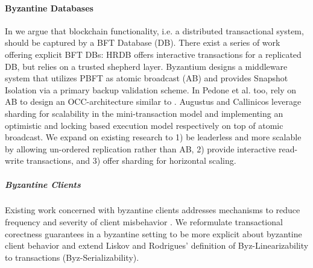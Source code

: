 \paragraph{Byzantine Databases}
In \sys we argue that blockchain functionality, i.e. a distributed transactional system, should be captured by a BFT Database (DB). There exist a series of work offering explicit BFT DBs: HRDB \cite{vandiver2007tolerating} offers interactive transactions for a replicated DB, but relies on a trusted shepherd layer. Byzantium \cite{garcia2011efficient} designs a middleware system that utilizes PBFT as atomic broadcast (AB) and provides Snapshot Isolation via a primary backup validation scheme. In \cite{pedone2012byzantine} Pedone et al. too, rely on AB to design an OCC-architecture similar to \sys. Augustus \cite{padilha2013augustus} and Callinicos \cite{padilha2016callinicos} leverage sharding for scalability in the mini-transaction model \cite{aguilera2007sinfonia} and implementing an optimistic and locking based execution model respectively on top of atomic broadcast.
We expand on existing research to 1) be leaderless and more scalable by allowing un-ordered replication rather than AB, 2) provide interactive read-write transactions, and 3) offer sharding for horizontal scaling.
\subparagraph{Byzantine Clients}
Existing work concerned with byzantine clients addresses mechanisms to reduce frequency and severity of client misbehavior \cite{liskov2006tolerating, garcia2011efficient, pedone2012byzantine, padilha2013augustus, padilha2016callinicos, luiz2011byzantine, }. We reformulate transactional corectness guarantees in a byzantine setting to be more explicit about byzantine client behavior  and extend Liskov and Rodrigues' \cite{liskov2006tolerating} definition of Byz-Linearizability to transactions (Byz-Serializability). 


\iffalse
{}














